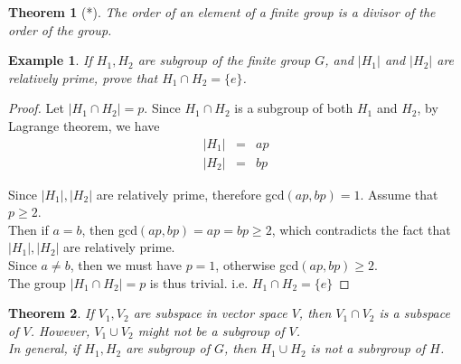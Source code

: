 \documentclass{article}
\theoremstyle{MyNonumberplain}
\theoremstyle{break}
\newtheorem*{proof}{Proof. }
\theoremstyle{break}
\newtheorem{theorem}{Theorem}[section]
\newtheorem{example}{Example}[section]
\theoremstyle{break}
\theoremstyle{definition}
\theoremstyle{break}
\begin{document}
\begin{thmbox}
    \begin{theorem}[*]
        The order of an element of a finite group is a divisor of the order of the group.
    \end{theorem}
\end{thmbox}

\begin{expbox}
    \begin{example}
        If $H_1, H_2$ are subgroup of the finite group $G$, and $| H_1 |$ and $| H_2
        |$ are relatively prime, prove that $H_1 \cap H_2 = \{ e \}$.
    \end{example}
    \begin{prfbox}
        \begin{proof}
            Let $|H_1\cap H_2|=p$. Since $H_1\cap H_2$ is a subgroup of both $H_1$ and $H_2$, by Lagrange theorem, we have 
            \begin{eqnarray*}
                |H_1| & = & ap\\
                |H_2| & = & bp
            \end{eqnarray*}

            Since $|H_1|,|H_2|$ are relatively prime, therefore gcd$(ap,bp)=1$. Assume that $p\geq 2$.\\

            Then if $a=b$, then gcd$(ap,bp)=ap=bp\geq2$, which contradicts the fact that $|H_1|,|H_2|$ are relatively prime.\\

            Since $a\neq b$, then we must have $p=1$, otherwise gcd$(ap,bp)\geq2$.\\

            The group $|H_1\cap H_2|=p$ is thus trivial. i.e. $H_1\cap H_2=\{e\}$
        \end{proof}
    \end{prfbox}
\end{expbox}

\begin{thmbox}
    \begin{theorem}
        If $V_1, V_2$ are subspace in vector space $V$, then $V_1 \cap V_2$ is a
        subspace of $V$. However, $V_1 \cup V_2$ might not be a subgroup of $V$.\\

        In general, if $H_1, H_2$ are subgroup of $G$, then $H_1 \cup H_2$ is not a
        subrgroup of $H$.
    \end{theorem}
\end{thmbox}
\end{document}
